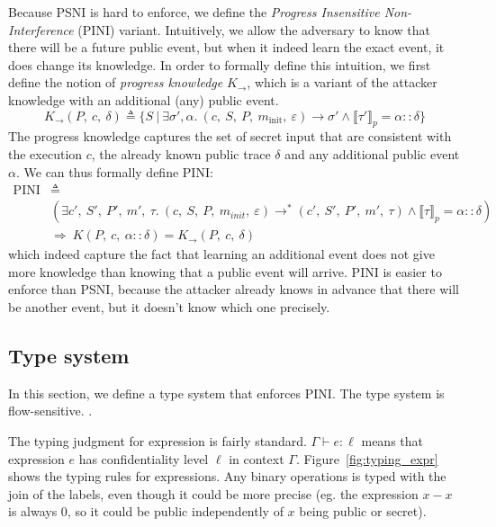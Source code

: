 \documentclass[10pt]{article}
\newcommand{\ctx}{\Gamma}
\newcommand{\conf}{\sigma}
\newcommand{\exec}[2] { #1 \rightarrow #2 }
\newcommand{\exectrans}[2] { #1 \rightarrow^{*} #2 }
\newcommand{\pproj}[1]{\llbracket #1 \rrbracket_{p}}
\newcommand{\etyping}[3]{ #1 \vdash #2 : #3}
\begin{document}
Because PSNI is hard to enforce, we define the \emph{Progress Insensitive Non-Interference} (PINI)
variant. Intuitively, we allow the adversary to know that there will be a future public event, but
when it indeed learn the exact event, it does change its knowledge. In order to formally define this
intuition, we first define the notion of \emph{progress knowledge} $K_{\rightarrow}$, which is a
variant of the attacker knowledge with an additional (any) public event.
\[
  K_{\rightarrow}(P,~c,~\delta) \triangleq
  \{ S ~|~ \exists \conf',\alpha.\
  \exec{(c,~S,~P,~m_{\mathrm{init}},~\varepsilon)}{\conf'}
  \wedge
  \pproj{\tau'} = \alpha::\delta
  \}
\]
The progress knowledge captures the set of secret input that are consistent with the execution $c$,
the already known public trace $\delta$ and any additional public event $\alpha$.
We can thus formally define PINI:
\begin{align*}
  \mathrm{PINI} &\triangleq \\
  &(\exists c',~S',~P',~m',~\tau.\
  \exectrans{(c,~S,~P,~m_{init},~\varepsilon)}{(c',~S',~P',~m',~\tau)}
  \wedge
  \pproj{\tau} = \alpha::\delta) \\
  &\Rightarrow
  \ K(P,~c,~\alpha::\delta) = K_{\rightarrow}(P,~c,~\delta)
\end{align*}
which indeed capture the fact that learning an additional event does not give more knowledge than
knowing that a public event will arrive.
PINI is easier to enforce than PSNI, because the attacker already knows in advance that there will
be another event, but it doesn't know which one precisely.

\subsection{Type system}%
\label{subsec:type_system}
In this section, we define a type system that enforces PINI. The type system is flow-sensitive.
.

The typing judgment for expression is fairly standard. \( \etyping{\ctx}{e}{\ell} \) means that
expression \( e \) has confidentiality level \( \ell \) in context \( \ctx \).
Figure~\ref{fig:typing_expr} shows the typing rules for expressions. Any binary operations is typed
with the join of the labels, even though it could be more precise (eg. the expression $x - x$ is
always 0, so it could be public independently of $x$ being public or secret).


\end{document}
